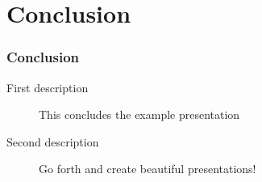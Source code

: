 \documentclass{beamer}
\begin{document}
\section{Conclusion}

\begin{frame}
  \frametitle{Conclusion}
  \begin{description}
  \item[First description] This concludes the example presentation
  \item[Second description] Go forth and create beautiful presentations!
  \end{description}
\end{frame}
\end{document}
